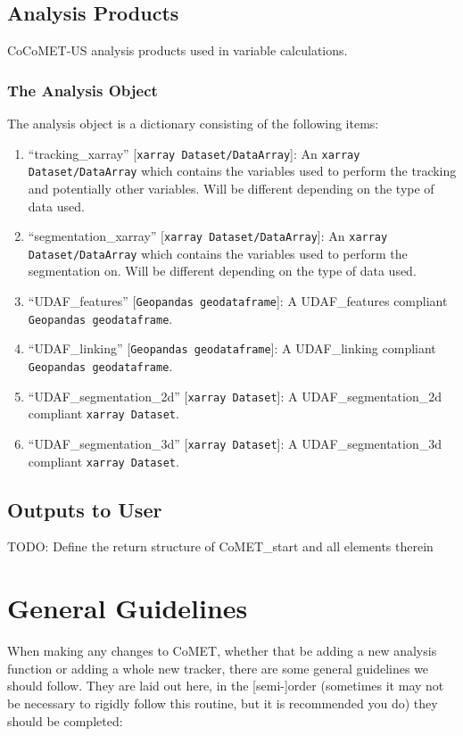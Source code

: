 \documentclass[10pt,a4paper]{article}
\begin{document}
	\subsection{Analysis Products}
	\ac{CoCoMET-US} analysis products used in variable calculations.
	
	\subsubsection{The Analysis Object}
	The analysis object is a dictionary consisting of the following items:
	\begin{enumerate}
		\item “tracking\_xarray” [\verb|xarray Dataset/DataArray|]: An \verb|xarray Dataset/DataArray| which contains the variables used to perform the tracking and potentially other variables. Will be different depending on the type of data used.
		\item “segmentation\_xarray” [\verb|xarray Dataset/DataArray|]: An \verb|xarray Dataset/DataArray| which contains the variables used to perform the segmentation on. Will be different depending on the type of data used.
		\item “UDAF\_features” [\verb|Geopandas geodataframe|]: A UDAF\_features compliant \verb|Geopandas geodataframe|. %
		\item “UDAF\_linking” [\verb|Geopandas geodataframe|]: A UDAF\_linking compliant \verb|Geopandas geodataframe|.
		\item “UDAF\_segmentation\_2d” [\verb|xarray Dataset|]: A UDAF\_segmentation\_2d compliant \verb|xarray Dataset|.
		\item “UDAF\_segmentation\_3d” [\verb|xarray Dataset|]: A UDAF\_segmentation\_3d compliant \verb|xarray Dataset|.
	\end{enumerate}	
	
	\subsection{Outputs to User}
	TODO: Define the return structure of CoMET\_start and all elements therein
	
	\section{General Guidelines}
	When making any changes to \ac{CoMET}, whether that be adding a new analysis function or adding a whole new tracker, there are some general guidelines we should follow. They are laid out here, in the [semi-]order (sometimes it may not be necessary to rigidly follow this routine, but it is recommended you do) they should be completed:
	
\end{document}
